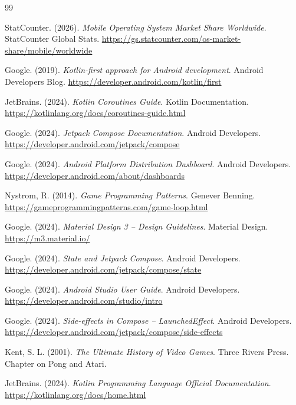 \documentclass[12pt,a4paper]{report}
\begin{document}
\begin{thebibliography}{99}

StatCounter. (2026). \textit{Mobile Operating System Market Share Worldwide}. StatCounter Global Stats. \url{https://gs.statcounter.com/os-market-share/mobile/worldwide}

Google. (2019). \textit{Kotlin-first approach for Android development}. Android Developers Blog. \url{https://developer.android.com/kotlin/first}

JetBrains. (2024). \textit{Kotlin Coroutines Guide}. Kotlin Documentation. \url{https://kotlinlang.org/docs/coroutines-guide.html}

Google. (2024). \textit{Jetpack Compose Documentation}. Android Developers. \url{https://developer.android.com/jetpack/compose}

Google. (2024). \textit{Android Platform Distribution Dashboard}. Android Developers. \url{https://developer.android.com/about/dashboards}

Nystrom, R. (2014). \textit{Game Programming Patterns}. Genever Benning. \url{https://gameprogrammingpatterns.com/game-loop.html}

Google. (2024). \textit{Material Design 3 -- Design Guidelines}. Material Design. \url{https://m3.material.io/}

Google. (2024). \textit{State and Jetpack Compose}. Android Developers. \url{https://developer.android.com/jetpack/compose/state}

Google. (2024). \textit{Android Studio User Guide}. Android Developers. \url{https://developer.android.com/studio/intro}

Google. (2024). \textit{Side-effects in Compose -- LaunchedEffect}. Android Developers. \url{https://developer.android.com/jetpack/compose/side-effects}

Kent, S. L. (2001). \textit{The Ultimate History of Video Games}. Three Rivers Press. Chapter on Pong and Atari.

JetBrains. (2024). \textit{Kotlin Programming Language Official Documentation}. \url{https://kotlinlang.org/docs/home.html}

\end{thebibliography}
\end{document}
